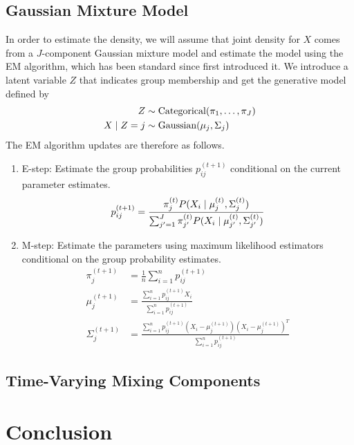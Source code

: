 \documentclass[12pt]{article}
\newcommand*{\cond}{\;\ifnum\currentgrouptype=16 \middle\fi|\;}
\newcommand*{\dist}{\sim}
\newcommand*{\mt}[1]{\text{\normalfont #1}}
\theoremstyle{definition}
\theoremstyle{algodesc}
\begin{document}
\subsection{Gaussian Mixture Model}
In order to estimate the density, we will assume that joint density for $X$ comes from a $J$-component Gaussian mixture model and estimate the model using the EM algorithm, which has been standard since \citet{dempsterlairdrubin77} first introduced it. We introduce a latent variable $Z$ that indicates group membership and get the generative model defined by
\begin{equation} \label{eq:gmm}
\begin{aligned}
Z &\dist \mt{Categorical}(\pi_1, \dots, \pi_J) \\
X \cond Z = j &\dist \mt{Gaussian}(\mu_j, \Sigma_j)
\end{aligned}
\end{equation}
The EM algorithm updates are therefore as follows.
\begin{enumerate}
\item
  E-step: Estimate the group probabilities $p_{ij}^{(t+1)}$ conditional on the current parameter estimates.
  \begin{equation} \label{eq:gmm_estep}
  p_{ij}^{(t+1)} = \frac{\pi_j^{(t)} P( X_i \cond \mu_j^{(t)}, \Sigma_j^{(t)})}{\sum_{j'=1}^J \pi_{j'}^{(t)} P( X_i \cond \mu_{j'}^{(t)}, \Sigma_{j'}^{(t)})}
  \end{equation}

\item
  M-step: Estimate the parameters using maximum likelihood estimators conditional on the group probability estimates.
  \begin{equation}
  \begin{aligned}
  \pi_j^{(t+1)} &= \frac{1}{n} \sum_{i=1}^n p_{ij}^{(t+1)} \\
  \mu_j^{(t+1)} &= \frac{\sum_{i=1}^n p_{ij}^{(t+1)} X_i}{\sum_{i=1}^n p_{ij}^{(t+1)}} \\
  \Sigma_j^{(t+1)} &= \frac{\sum_{i=1}^n p_{ij}^{(t+1)} (X_i - \mu_j^{(t+1)}) (X_i - \mu_j^{(t+1)})^T}{\sum_{i=1}^n p_{ij}^{(t+1)}}
  \end{aligned}
  \end{equation}
\end{enumerate}


\subsection{Time-Varying Mixing Components}



\section{Conclusion}




\end{document}
